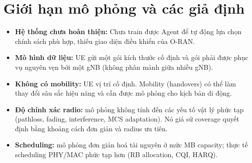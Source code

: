 \section{Giới hạn mô phỏng và các giả định}

\begin{itemize}
\item \textbf{Hệ thống chưa hoàn thiện:} Chưa train được Agent để tự động lựa chọn chính sách phù hợp, thiếu giao diện điều khiển của O-RAN.
\item \textbf{Mô hình dữ liệu:} UE gửi một gói kích thước cố định và gói phải được phục vụ nguyên vẹn bởi một gNB (không phân mảnh giữa nhiều gNB).
\item \textbf{Không có mobility:} UE vị trí cố định. Mobility (handovers) có thể làm thay đổi sâu sắc hiệu năng và cần được mô phỏng cho kịch bản di động.
\item \textbf{Độ chính xác radio:} mô phỏng không tính đến các yếu tố vật lý phức tạp (pathloss, fading, interference, MCS adaptation). Nó giả sử coverage quyết định bằng khoảng cách đơn giản và radius ưu tiên.
\item \textbf{Scheduling:} mô phỏng đơn giản hoá tài nguyên ở mức MB capacity; thực tế scheduling PHY/MAC phức tạp hơn (RB allocation, CQI, HARQ).
\end{itemize}